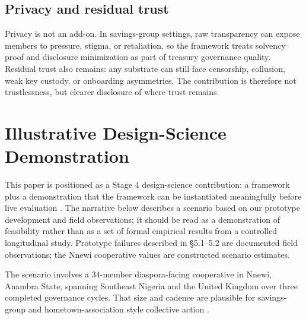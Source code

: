 \documentclass[sigconf,anonymous]{acmart}
\begin{document}
\subsection{Privacy and residual trust}

Privacy is not an add-on. In savings-group settings, raw transparency can expose members to pressure, stigma, or retaliation, so the framework treats solvency proof and disclosure minimization as part of treasury governance quality. Residual trust also remains: any substrate can still face censorship, collusion, weak key custody, or onboarding asymmetries. The contribution is therefore not trustlessness, but clearer disclosure of where trust remains.

\section{Illustrative Design-Science Demonstration}


This paper is positioned as a Stage 4 design-science contribution: a framework plus a demonstration that the framework can be instantiated meaningfully before live evaluation \cite{hevner2004, peffers2007, dresch2015}. The narrative below describes a scenario based on our prototype development and field observations; it should be read as a demonstration of feasibility rather than as a set of formal empirical results from a controlled longitudinal study. Prototype failures described in §5.1–5.2 are documented field observations; the Nnewi cooperative values are constructed scenario estimates.

The scenario involves a 34-member diaspora-facing cooperative in Nnewi, Anambra State, spanning Southeast Nigeria and the United Kingdom over three completed governance cycles. That size and cadence are plausible for savings-group and hometown-association style collective action \cite{besley1993}.
\end{document}
